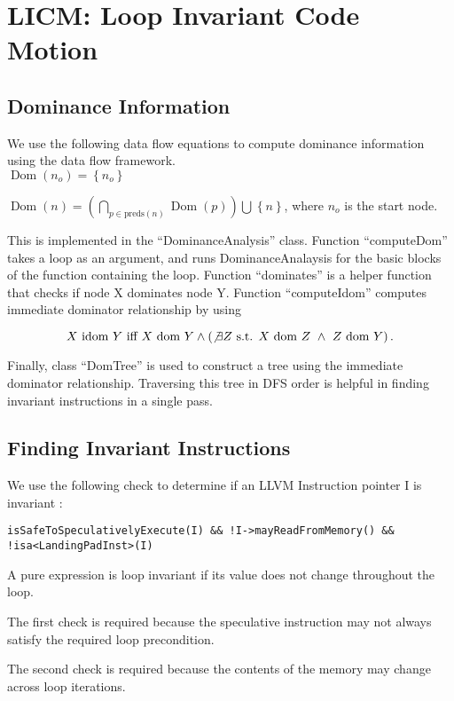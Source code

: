 \section{LICM: Loop Invariant Code Motion}

\subsection{Dominance Information}

We use the following data flow equations to compute dominance information using the
data flow framework. \\

$\operatorname{Dom}(n_o) = \left \{ n_o \right \}$

$\operatorname{Dom}(n) = \left ( \bigcap_{p \in \text{preds}(n)}^{} \operatorname{Dom}(p) \right ) \bigcup^{} \left \{ n \right \}$,
where $n_o$ is the start node.

This is implemented in the ``DominanceAnalysis'' class. Function ``computeDom'' takes a loop as an argument, and runs DominanceAnalaysis for the basic blocks of the function containing the loop. Function ``dominates'' is a helper function that checks if node X dominates node Y. Function ``computeIdom'' computes immediate dominator relationship by using

$$
X \text{ idom } Y \text{ iff } X \text{ dom } Y \land \left(\not\exists Z \text { s.t. } X \text{ dom } Z\ \land\ Z \text{ dom } Y\right).
$$

Finally, class ``DomTree'' is used to construct a tree using the immediate dominator relationship. Traversing this tree in DFS order is helpful in finding invariant instructions in a single pass.

\subsection{Finding Invariant Instructions}

We use the following check to determine if an LLVM Instruction pointer I is invariant :

\texttt{isSafeToSpeculativelyExecute(I) \&\& !I->mayReadFromMemory() \&\& !isa<LandingPadInst>(I)}

A pure expression is loop invariant if its value does not change throughout the loop. 

The first check is required because the speculative instruction may not always satisfy the required loop precondition.

The second check is required because the contents of the memory may change across loop iterations.

